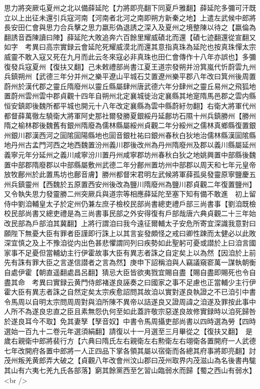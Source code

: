 思力將突厥屯夏州之北以備薛延陀【力將即亮翻下同夏戶雅翻】薛延陀多彌可汗既立以上出征未還引兵寇河南【河南者北河之南即朔方新秦之地】上遣左武候中郎將長安田仁會與思力合兵擊之思力嬴形偽退誘之深入及夏州之境整陳以待之【嬴倫為翻誘音酉陳讀曰陣】薛延陀大敗追奔六百餘里耀威磧北而還【磧七迹翻還從宣翻又如字　考異曰高宗實録云會延陀死耀威漠北而還其意指真珠為延陀也按真珠憚太宗威靈不敢入寇又死在九月而此云冬來寇必非真珠也田仁會傳作十八年亦誤也】多彌復發兵寇夏州【復扶又翻】己未敕禮部尚書江夏王道宗發朔并汾箕嵐代忻蔚雲九州兵鎮朔州【武德三年分并州之樂平遼山平城石艾置遼州樂平郡八年改曰箕州後周置蔚州於漢代郡之靈丘隋廢州以靈丘縣屬肆州唐武德六年分肆州之靈丘易州之飛狐地置蔚州雲州雲中郡貞觀十四年自朔州北定襄城徙治定襄縣其地寔隋馬邑郡之雲内縣恒安鎮即後魏所都平城也開元十八年改定襄縣為雲中縣蔚紆勿翻】右衛大將軍代州都督薛萬徹左驍衛大將軍阿史那社爾發勝夏銀綏丹延鄜坊石隰十州兵鎮勝州【勝州隋之榆林郡後魏舊有銀州隋廢為儒林縣屬綏州貞觀二年分綏州之儒林真鄉縣復置銀州銀川郡漢西河之圁隂圁陽縣地也圁音銀杜祐曰銀州春秋白狄地治儒林縣漢圁隂縣地丹州古孟門河西之地西魏置汾州義川郡後改州為丹州隋廢州及郡以義川縣屬延州義寧元年分延州之義川咸寧汾川置丹州咸寧郡坊州春秋白狄之地姚興置中部縣後魏置中部郡隋廢郡以中部縣屬敷州武德二年分鄜州置坊州中部郡以周天和七年元皇帝放牧鄜州於此置馬坊也鄜音膚】勝州都督宋君明左武候將軍薛孤吳發靈原寧鹽慶五州兵鎮靈州【西魏於五原置西安州後改為鹽川隋廢州為鹽川郡貞觀二年復置鹽州】又令執失思力發靈勝二州突厥兵與道宗等相應薛延陀至塞下知有備不敢進　初上留侍中劉洎輔皇太子於定州仍兼左庶子檢校民部尚書總吏禮戶部三尚書事【劉洎既檢校民部尚書又總吏禮是為三尚書事民部之外安得復有戶部哉唐六典貞觀二十三年始改民部為戶部洎其冀翻】上將行謂洎曰我今遠征爾輔太子安危所寄宜深識我意對曰願陛下無憂大臣有罪者臣謹即行誅上以其言妄發頗怪之戒曰卿性踈而太健必以此敗深宜慎之及上不豫洎從内出色甚悲懼謂同列曰疾勢如此聖躬可憂或譛於上曰洎言國家事不足憂但當輔幼主行伊霍故事大臣有異志者誅之自定矣上以為然【因洎於上前先有誅有罪大臣之言遂信譛者之言為然】庚申下詔稱洎與人竊議窺窬萬一謀執朝衡自處伊霍【朝直遥翻處昌呂翻】猜忌大臣皆欲夷戮宜賜自盡【賜自盡即賜死也令自盡其命　考異曰實録云黄門侍郎褚遂良誣奏之曰國家之事不足慮也正當輔少主行伊霍大臣有異志者誅之自然定矣太宗疾愈詔問其故洎以實對遂良執證之不已洎引中書令馬周以自明太宗問周周對與洎所陳不異帝以詰遂良又證周諱之洎遂及罪按此事中人所不為遂良忠直之臣且素無怨仇何至如此蓋許敬宗惡遂良故修實録時以洎死歸咎於遂良耳今不取】免其妻孥【孥音奴】中書令馬周攝吏部尚書以四時選為勞【四時選始一百九十二卷元年選須絹翻】請復以十一月選至三月畢從之【復扶又翻】　是歲右親衛中郎將裴行方【六典曰隋氏左右親衛左右勲衛左右翊衛各置開府一人武德七年改開府各置中郎將一人正四品下掌各領其屬以宿衛而各總其府事將即亮翻】討茂州叛羌黄郎弄大破之【貞觀八年改會州汶山郡曰茂州取界内茂滋山為名後書冉駹其山有六夷七羌九氏各部落】窮其餘黨西至乞習山臨弱水而歸【蜀之西山有弱水】<br />
